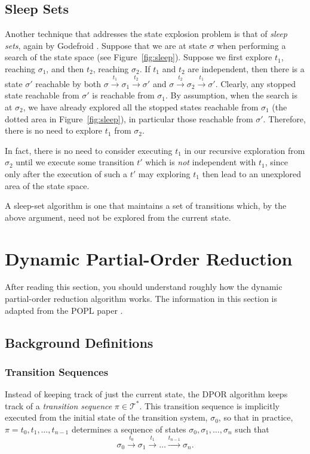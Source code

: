 \documentclass[12pt,a4paper,twoside,openany]{report}
\begin{document}
\subsection{Sleep Sets}
\label{sec:sleep-prep}

Another technique that addresses
the state explosion problem is
that of \emph{sleep sets}, again by Godefroid \cite{god91}.
Suppose that
we are at state $\sigma$ when performing a search
of the state space (see Figure~\ref{fig:sleep}).
Suppose we first explore $t_1$, reaching $\sigma_1$,
and then $t_2$, reaching $\sigma_2$.
If $t_1$ and $t_2$ are independent, then there
is a state $\sigma'$ reachable by both
$\sigma \xrightarrow{t_1} \sigma_1
\xrightarrow{t_2} \sigma'$ and
$\sigma \xrightarrow{t_2} \sigma_2
\xrightarrow{t_1} \sigma'$.
Clearly, any stopped state reachable from $\sigma'$
is reachable from $\sigma_1$. By assumption,
when the search is at $\sigma_2$, we have already
explored all the stopped states reachable from
$\sigma_1$ (the dotted area in Figure~\ref{fig:sleep}),
in particular those reachable from
$\sigma'$. Therefore, there is no need to
explore $t_1$ from $\sigma_2$.

In fact, there is no need to consider executing
$t_1$ in our recursive exploration from $\sigma_2$
until we execute some transition $t'$ which is
\emph{not} independent with $t_1$, since only after
the execution of such a $t'$ may exploring $t_1$
then lead to an unexplored area of the state space.

A sleep-set algorithm is one that maintains a
set of transitions which, by the above argument,
need not be explored from the current state.

\section{Dynamic Partial-Order Reduction}
\label{sec:dpor-prep}
After reading this section, you should
understand roughly how the dynamic
partial-order reduction algorithm works.
The information in this section is
adapted from the POPL paper \cite{flan05}.

\subsection{Background Definitions}

\subsubsection{Transition Sequences}
Instead of keeping track of just the current state,
the DPOR algorithm
keeps track of a \emph{transition
sequence} $\pi \in \mathcal{T}^*$. This transition
sequence is implicitly executed from the initial state of
the transition system, $\sigma_0$, so that in practice,
$\pi = t_0, t_1, \ldots, t_{n-1}$ determines a sequence of states
$\sigma_0, \sigma_1, \ldots, \sigma_n$ such that
\[
	\sigma_0 \xrightarrow{\ t_0\ } \sigma_1 \xrightarrow{\ t_1\ }
	\ldots \xrightarrow{t_{n-1}} \sigma_n.
\]
\end{document}
